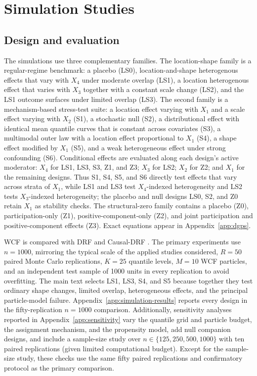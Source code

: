\documentclass[twoside]{article}
\begin{document}
\section{Simulation Studies}\label{sec:simulations}

\subsection{Design and evaluation}\label{sec:sim-design}

The simulations use three complementary families. The location-shape family is a regular-regime benchmark: a placebo (LS0), location-and-shape heterogenous effects that vary with $X_4$ under moderate overlap (LS1), a location heterogenous effect that varies with $X_3$ together with a constant scale change (LS2), and the LS1 outcome surfaces under limited overlap (LS3). The second family is a mechanism-based stress-test suite: a location effect varying with $X_1$ and a scale effect varying with $X_2$ (S1), a stochastic null (S2), a distributional effect with identical mean quantile curves that is constant across covariates (S3), a multimodal outer law with a location effect proportional to $X_1$ (S4), a shape effect modified by $X_1$ (S5), and a weak heterogeneous effect under strong confounding (S6). Conditional effects are evaluated along each design's active moderator: $X_4$ for LS1, LS3, S3, Z1, and Z3; $X_3$ for LS2; $X_2$ for Z2; and $X_1$ for the remaining designs. Thus S1, S4, S5, and S6 directly test effects that vary across strata of $X_1$, while LS1 and LS3 test $X_4$-indexed heterogeneity and LS2 tests $X_3$-indexed heterogeneity; the placebo and null designs LS0, S2, and Z0 retain $X_1$ as stability checks. The structural-zero family contains a placebo (Z0), participation-only (Z1), positive-component-only (Z2), and joint participation and positive-component effects (Z3). Exact equations appear in Appendix~\ref{app:dgps}. 

WCF is compared with DRF and Causal-DRF \citep{DRF-paper,naf2026causaldrf}. The primary experiments use $n=1000$, mirroring the typical scale of the applied studies considered, $R=50$ paired Monte Carlo replications, $K=25$ quantile levels, $M=10$ WCF particles, and an independent test sample of 1000 units in every replication to avoid overfitting. The main text selects LS1, LS3, S4, and S5 because together they test ordinary shape changes, limited overlap, heterogeneous effects, and the principal particle-model failure. Appendix~\ref{app:simulation-results} reports every design in the fifty-replication $n=1000$ comparison. Additionally, sensitivity analyses reported in Appendix~\ref{app:sensitivity} vary the quantile grid and particle budget, the assignment mechanism, and the propensity model, add null companion designs, and include a sample-size study over $n\in\{125,250,500,1000\}$ with ten paired replications (given limited computational budget). Except for the sample-size study, these checks use the same fifty paired replications and confirmatory protocol as the primary comparison.
\end{document}
